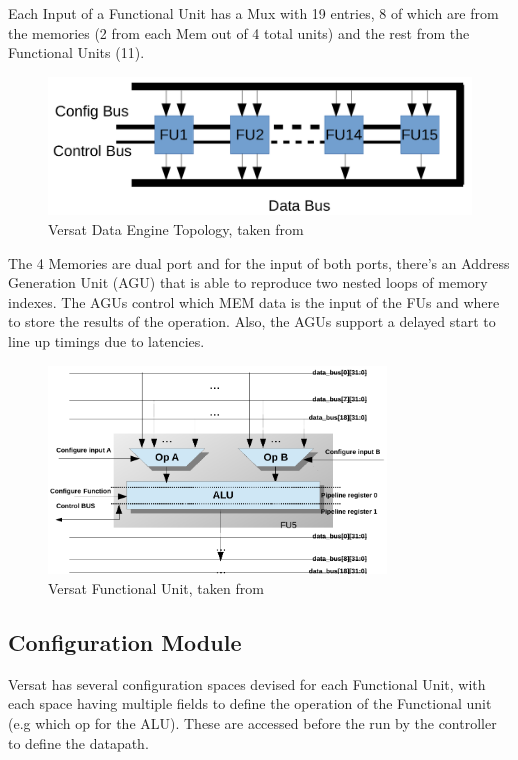 Each Input of a Functional Unit has a Mux with 19 entries, 8 of which are from the memories (2 from each Mem out of 4 total units) and the rest from the Functional Units (11).

 \begin{figure}[!htbp]
    \centering
    \includegraphics[width=1\textwidth]{Figures/de.png}
    \caption{Versat Data Engine Topology, taken from~\cite{sousa:FFT}}
    \label{figure:DE}
\end{figure} 

 The 4 Memories are dual port and for the input of both ports, 
 there's an Address Generation Unit (AGU) that is able to 
 reproduce two nested loops of memory indexes.
 The AGUs control which MEM data is the input of the FUs and where
 to store the results of the operation. Also, the AGUs support a delayed start to line up timings
due to latencies.

\begin{figure}[!htbp]
    \centering
    \includegraphics[width=0.8\textwidth]{Figures/FU.pdf}
    \caption{Versat Functional Unit, taken from~\cite{lopes:versat}}
    \label{figure:FU}
\end{figure} 


\newpage
\subsection{Configuration Module}
Versat has several configuration spaces devised for each Functional Unit,
with each space having multiple fields to define the operation of the Functional unit (e.g which op for the ALU).
These are accessed before the run by the controller to define the datapath.

